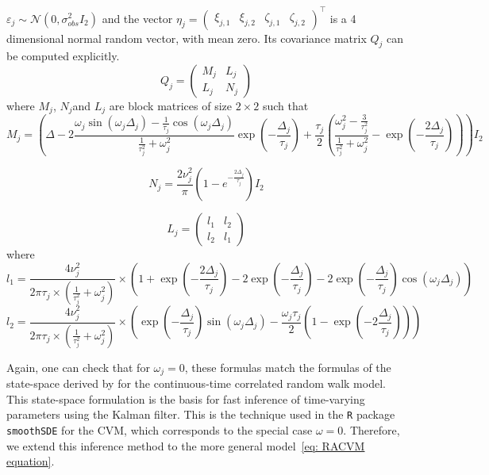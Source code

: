 \documentclass[11pt]{article}
\newcommand {\1}{\mathbb{1}}
\begin{document}
$\varepsilon_j \sim \mathcal{N}(0,\sigma_{obs}^2 I_2)$ and the vector $\eta_j=\begin{pmatrix} \xi_{j,1} & \xi_{j,2} & \zeta_{j,1} & \zeta_{j,2} \end{pmatrix}^\top$ is a 4 dimensional normal random vector, with mean zero. Its covariance matrix $Q_j$ can be computed explicitly.
\begin{equation}
	Q_j=\begin{pmatrix}
		M_j & L_j \\
		L_j & N_j
	\end{pmatrix}
	\label{eq: state space covariance}
\end{equation}
where $M_j$, $N_j$and $L_j$ are block matrices of size $2 \times 2$ such that 
\[M_j=\left( \Delta-2 \frac{\omega_j \sin(\omega_j \Delta_j)-\frac{1}{\tau_j} \cos(\omega_j \Delta_j)}{\frac{1}{\tau_j^2}+\omega_j^2 } \exp\left( -\frac{\Delta_j}{\tau_j} \right) +\frac{\tau_j}{2} \left( \frac{\omega_j^2-\frac{3}{\tau_j^2}}{\frac{1}{\tau_j^2}+\omega_j^2}-\exp\left( -\frac{2\Delta_j}{\tau_j}\right)\right) \right)I_2\]

\[N_j=\frac{2\nu_j^2}{\pi}\left(1-e^{-\frac{2 \Delta_j}{\tau_j}}\right)I_2\]

\[L_j=\begin{pmatrix} l_1 & l_2 \\
	l_2 & l_1\end{pmatrix}\]
where 
\[l_1=\frac{4\nu_j^2}{2 \pi \tau_j \times \left( \frac{1}{\tau_j^2}+\omega_j^2\right)} \times \left( 1+\exp\left( -\frac{2\Delta_j}{\tau_j}\right)-2\exp\left( -\frac{\Delta_j}{\tau_j}\right)-2\exp\left( -\frac{\Delta_j}{\tau_j}\right) \cos(\omega_j \Delta_j)\right)\]
\[l_2=\frac{4\nu_j^2}{2 \pi \tau_j \times \left( \frac{1}{\tau_j^2}+\omega_j^2\right)} \times\left( \exp\left( -\frac{\Delta_j}{\tau_j}\right) \sin(\omega_j \Delta_j)-\frac{\omega_j \tau_j}{2} \left(1-\exp\left( -2 \frac{\Delta_j}{\tau_j}\right) \right)\right)\]

Again, one can check that for $\omega_j=0$, these formulas match the formulas of the state-space derived by \cite{johnson_continuoustime_2008} for the continuous-time correlated random walk model.
This state-space formulation is the basis for fast inference of time-varying parameters using the Kalman filter. This is the technique used in the \texttt{R} package \texttt{smoothSDE} \cite{michelot_varying-coefficient_2021} for the CVM, which corresponds to the special case $\omega=0$. Therefore, we extend this inference method to the more general model~\ref{eq: RACVM equation}.
\end{document}
